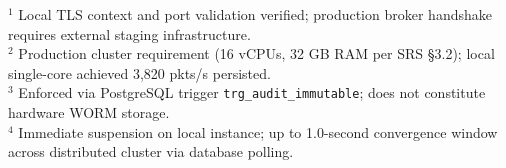 \begin{table}[H]
\begin{tabularx}{\linewidth}{@{}l p{1.6cm} p{2.4cm} p{2.2cm} p{2.2cm} p{2.5cm}@{}}
\bottomrule
\end{tabularx}
\begin{flushleft}
\scriptsize
$^1$ Local TLS context and port validation verified; production broker handshake requires external staging infrastructure.\\
$^2$ Production cluster requirement (16 vCPUs, 32 GB RAM per SRS §3.2); local single-core achieved 3,820 pkts/s persisted.\\
$^3$ Enforced via PostgreSQL trigger \texttt{trg\_audit\_immutable}; does not constitute hardware WORM storage.\\
$^4$ Immediate suspension on local instance; up to 1.0-second convergence window across distributed cluster via database polling.
\end{flushleft}
\end{table}
